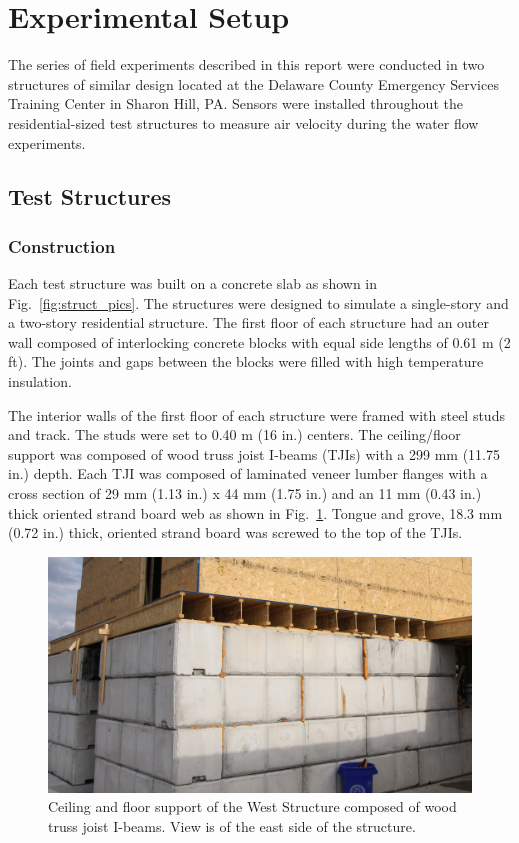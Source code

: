 \documentclass[12pt,oneside]{book}
\begin{document}
\section{Experimental Setup}
\label{sec:exp_setup}

The series of field experiments described in this report were conducted in two structures of similar design located at the Delaware County Emergency Services Training Center in Sharon Hill, PA. Sensors were installed throughout the residential-sized test structures to measure air velocity during the water flow experiments.  

\subsection{Test Structures}
\label{subsec:test_structs}

\subsubsection{Construction}
\label{subsubsec:construction}
Each test structure was built on a concrete slab as shown in Fig.~\ref{fig:struct_pics}. The structures were designed to simulate a single-story and a two-story residential structure. The first floor of each structure had an outer wall composed of interlocking concrete blocks with equal side lengths of 0.61 m (2 ft). The joints and gaps between the blocks were filled with high temperature insulation.

The interior walls of the first floor of each structure were framed with steel studs and track. The studs were set to 0.40 m (16 in.) centers. The ceiling/floor support was composed of wood truss joist I-beams (TJIs) with a 299 mm (11.75 in.) depth. Each TJI was composed of laminated veneer lumber flanges with a cross section of 29 mm (1.13 in.) x 44 mm (1.75 in.) and an 11 mm (0.43 in.) thick oriented strand board web as shown in Fig.~\ref{fig:TJI}. Tongue and grove, 18.3 mm (0.72 in.) thick, oriented strand board was screwed to the top of the TJIs.

\begin{figure}[!ht]
\includegraphics[width=6in]{../Pictures/TJI_support}
\caption[TJI-constructred ceiling/floor support of the West Structure.]{Ceiling and floor support of the West Structure composed of wood truss joist I-beams. View is of the east side of the structure.}
\label{fig:TJI}
\end{figure}
\FloatBarrier
\end{document}
